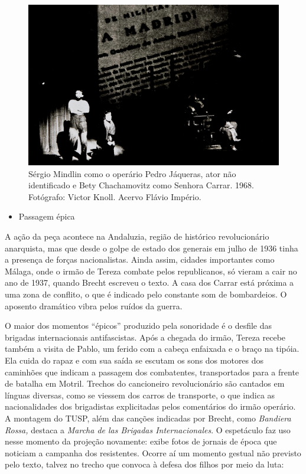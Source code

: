 \begin{figure}
\includegraphics[width=\columnwidth]{./media/IMAGEM42.png}
\caption{Sérgio Mindlin como o operário Pedro Jáqueras, ator não identificado e
Bety Chachamovitz como Senhora Carrar. 1968. Fotógrafo: Victor Knoll.
Acervo Flávio Império.}
\end{figure}

\begin{itemize}
\item
  Passagem épica
\end{itemize}

A ação da peça acontece na Andaluzia, região de histórico revolucionário
anarquista, mas que desde o golpe de estado dos generais em julho de
1936 tinha a presença de forças nacionalistas. Ainda assim, cidades
importantes como Málaga, onde o irmão de Tereza combate pelos
republicanos, só vieram a cair no ano de 1937, quando Brecht escreveu o
texto. A casa dos Carrar está próxima a uma zona de conflito, o que é
indicado pelo constante som de bombardeios. O aposento dramático vibra
pelos ruídos da guerra.

O maior dos momentos “épicos” produzido pela sonoridade é o desfile das
brigadas internacionais antifascistas. Após a chegada do irmão, Tereza
recebe também a visita de Pablo, um ferido com a cabeça enfaixada e o
braço na tipóia. Ela cuida do rapaz e com sua saída se escutam os sons
dos motores dos caminhões que indicam a passagem dos combatentes,
transportados para a frente de batalha em Motril. Trechos do cancioneiro
revolucionário são cantados em línguas diversas, como se viessem dos
carros de transporte, o que indica as nacionalidades dos brigadistas
explicitadas pelos comentários do irmão operário. A montagem do TUSP,
além das canções indicadas por Brecht, como \textit{Bandiera Rossa,}
destaca a \textit{Marcha de las Brigadas Internacionales}. O espetáculo faz
uso nesse momento da projeção novamente: exibe fotos de jornais de época
que noticiam a campanha dos resistentes. Ocorre aí um momento gestual
não previsto pelo texto, talvez no trecho que convoca à defesa dos
filhos por meio da luta:

